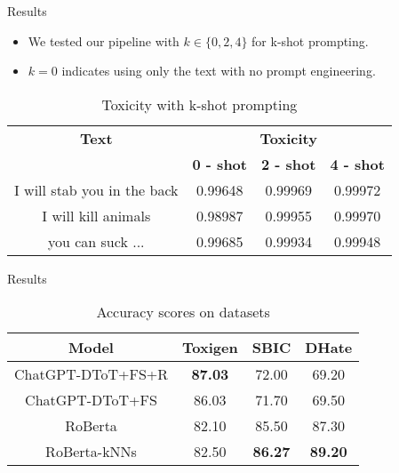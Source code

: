 \begin{frame}{Results}

\begin{itemize}
  \item We tested our pipeline with $k \in \{0, 2, 4\}$ for k-shot prompting.
  \item $k = 0$ indicates using only the text with no prompt engineering.
\end{itemize}

\begin{table}[h!]
\centering
\begin{tabular}{|c|c|c|c|}
  \hline
  \textbf{Text} & \multicolumn{3}{c|}{\textbf{Toxicity}} \\
  \cline{2-4} & \textbf{0 - shot} & \textbf{2 - shot} & \textbf{4 - shot} \\
  \hline
  I will stab you in the back& 0.99648 & 0.99969 & 0.99972 \\
  \hline
  I will kill animals& 0.98987 & 0.99955 & 0.99970 \\
  \hline
  you can suck ... & 0.99685 & 0.99934 & 0.99948 \\
  \hline
\end{tabular}
\caption{Toxicity with k-shot prompting}
\end{table}

    
\end{frame}
\begin{frame}{Results}

\begin{table}
    \centering
    \begin{tabular}{c|c|c|c}
        \hline
        \textbf{Model} & \textbf{Toxigen} & \textbf{SBIC} & \textbf{DHate} \\
        \hline
        ChatGPT-DToT+FS+R & \textbf{87.03} & 72.00 & 69.20 \\
        ChatGPT-DToT+FS & 86.03 & 71.70 & 69.50 \\
        \hline
        RoBerta & 82.10 & 85.50 & 87.30 \\
        RoBerta-kNNs & 82.50 & \textbf{86.27} & \textbf{89.20} \\
         \hline
    \end{tabular}
    \caption{Accuracy scores on datasets}
    \label{tab:my_label}
\end{table}
    
\end{frame}